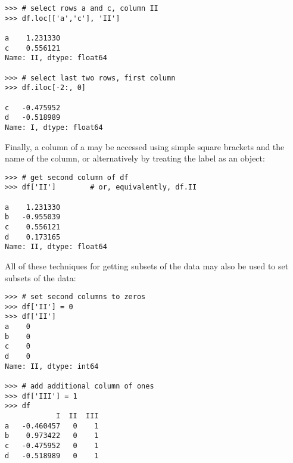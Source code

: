 \begin{lstlisting}
>>> # select rows a and c, column II
>>> df.loc[['a','c'], 'II']

a    1.231330
c    0.556121
Name: II, dtype: float64

>>> # select last two rows, first column
>>> df.iloc[-2:, 0]

c   -0.475952
d   -0.518989
Name: I, dtype: float64
\end{lstlisting}

Finally, a column of a  may be accessed using simple square
brackets and the name of the column, or alternatively by treating the label
as an object:
\begin{lstlisting}
>>> # get second column of df
>>> df['II']        # or, equivalently, df.II

a    1.231330
b   -0.955039
c    0.556121
d    0.173165
Name: II, dtype: float64
\end{lstlisting}

All of these techniques for getting subsets of the data may also be used to set
subsets of the data:

\begin{lstlisting}
>>> # set second columns to zeros
>>> df['II'] = 0
>>> df['II']
a    0
b    0
c    0
d    0
Name: II, dtype: int64

>>> # add additional column of ones
>>> df['III'] = 1
>>> df
            I  II  III
a   -0.460457   0    1
b    0.973422   0    1
c   -0.475952   0    1
d   -0.518989   0    1
\end{lstlisting}


